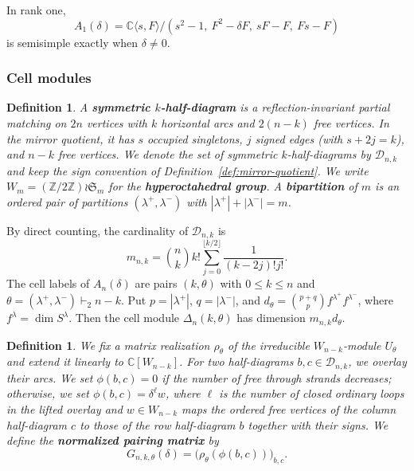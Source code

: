 \documentclass[11pt,a4paper]{amsart}
\newcommand{\C}{\mathbb C}\newcommand{\Q}{\mathbb Q}\newcommand{\Z}{\mathbb Z}
\theoremstyle{uprightdefinition}
\newtheorem{definition}[theorem]{Definition}
\theoremstyle{remark}\newtheorem{remark}[theorem]{Remark}
\begin{document}
In rank one,
\[
 A_1(\delta)=\C\langle s,F\rangle/
 (s^2-1,\ F^2-\delta F,\ sF-F,\ Fs-F)
\]
is semisimple exactly when $\delta\ne0$.

\subsubsection{Cell modules}
\begin{definition}\label{def:symmetric-half-diagrams}
\cite[Definitions~3.1--3.2]{Bowman2012}
A \textbf{symmetric $k$-half-diagram} is a reflection-invariant partial
matching on $2n$ vertices with $k$ horizontal arcs and $2(n-k)$ free vertices. In the mirror quotient, it has $s$ occupied
singletons, $j$ signed edges (with $s+2j=k$), and $n-k$ free
vertices. We denote the set of symmetric $k$-half-diagrams by $\mathcal D_{n,k}$ and keep the
sign convention of Definition~\ref{def:mirror-quotient}.
We write $W_m=(\mathbb Z/2\mathbb Z)\wr\mathfrak S_m$ for the
\textbf{hyperoctahedral group}. A \textbf{bipartition} of $m$
is an ordered pair of partitions $(\lambda^+,\lambda^-)$ with $|\lambda^+|+|\lambda^-|=m$.
\end{definition}

By direct counting, the cardinality of $\mathcal D_{n,k}$ is
\[
 m_{n,k}=\binom nk k!\sum_{j=0}^{\lfloor k/2\rfloor}
                     \frac1{(k-2j)!j!}.
\]
The cell labels of $A_n(\delta)$ are pairs $(k,\theta)$ with
$0\le k\le n$ and $\theta=(\lambda^+,\lambda^-)\vdash_2n-k$.
Put $p=|\lambda^+|$, $q=|\lambda^-|$, and
$d_\theta=\binom{p+q}{p}f^{\lambda^+}f^{\lambda^-}$, where
$f^\lambda=\dim S^\lambda$.
Then the cell module $\Delta_n(k,\theta)$ has dimension $m_{n,k}d_\theta$.

\begin{definition}\label{def:type-c-pairing}
\cite[Lemma~3.3]{Bowman2012}
We fix a
matrix realization $\rho_\theta$ of the irreducible $W_{n-k}$-module
$U_\theta$ and extend it linearly to $\mathbb C[W_{n-k}]$. For two half-diagrams $b,c\in\mathcal D_{n,k}$, we overlay their arcs. We set
$\phi(b,c)=0$ if the number of free through strands decreases; otherwise, we set
$\phi(b,c)=\delta^\ell w$, where $\ell$ is the number of closed ordinary
loops in the lifted overlay and $w\in W_{n-k}$ maps the ordered free vertices
of the \emph{column} half-diagram $c$ to those of the \emph{row} half-diagram $b$ together with their signs.
We define the \textbf{normalized pairing matrix} by
\begin{equation}\label{eq:normalized-G}
 G_{n,k,\theta}(\delta)=\bigl(\rho_\theta(\phi(b,c))\bigr)_{b,c}.
\end{equation}
\end{definition}
\end{document}
